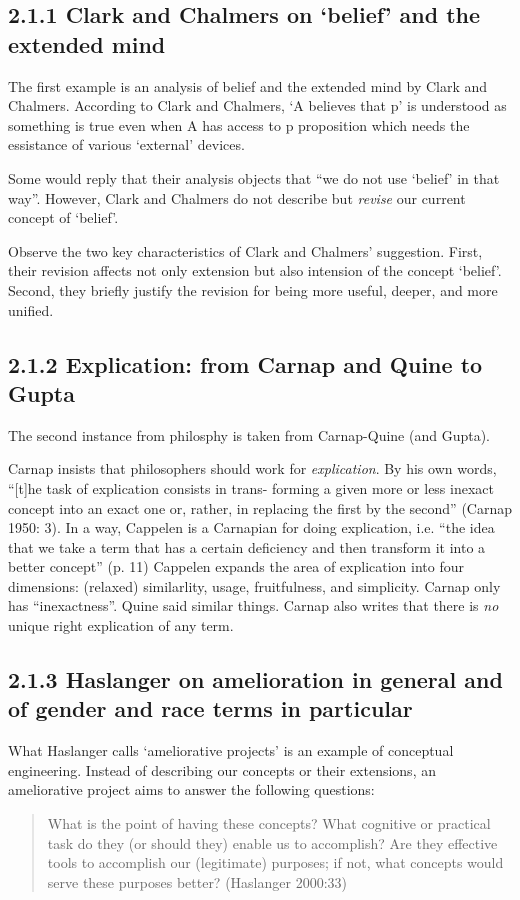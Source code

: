 \documentclass[
10pt, %
a4paper, %
twocolumn, %
landscape %
]{article}
\begin{document}
\subsection*{2.1.1 Clark and Chalmers on `belief' and the extended mind}
The first example is an analysis of belief and the extended mind by Clark and Chalmers.
According to Clark and Chalmers,  `A believes that p' is understood as something is true even when A has access to p proposition which needs the essistance of various `external' devices.

Some would reply that their analysis objects that ``we do not use `belief' in that way''.
However, Clark and Chalmers do not describe but \emph{revise} our current concept of `belief'.

Observe the two key characteristics of Clark and Chalmers' suggestion.
First, their revision affects not only extension but also intension of the concept `belief'.
Second, they briefly justify the revision for being more useful, deeper, and more unified.

\subsection*{2.1.2 Explication: from Carnap and Quine to Gupta}

The second instance from philosphy is taken from Carnap-Quine (and Gupta).

Carnap insists that philosophers should work for \emph{explication}.
By his own words, ``[t]he task of explication consists in trans- forming a given more or less inexact concept into an exact one or, rather, in replacing the first by the second'' (Carnap 1950: 3).
In a way, Cappelen is a Carnapian for doing explication, i.e. ``the idea that we take a term that has a certain deficiency and then transform it into a better concept'' (p. 11)
Cappelen expands the area of explication into four dimensions: (relaxed) similarlity, usage, fruitfulness, and simplicity. Carnap only has ``inexactness''.
Quine said similar things.
Carnap also writes that there is \emph{no} unique right explication of any term.

\subsection*{2.1.3 Haslanger on amelioration in general and of gender and race terms in particular}
What Haslanger calls `ameliorative projects' is an example of conceptual engineering. Instead of describing our concepts or their extensions, an ameliorative project aims to answer the following questions:
\begin{quote}
  What is the point of having these concepts? What cognitive or practical task do they (or should they) enable us to accomplish? Are they effective tools to accomplish our (legitimate) purposes; if not, what concepts would serve these purposes better? (Haslanger 2000:33)
\end{quote}
\end{document}
